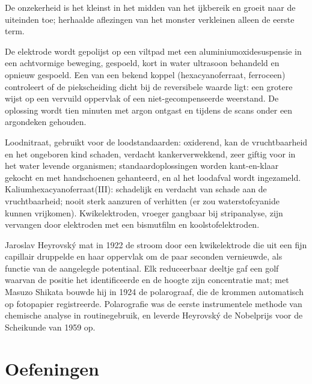 De onzekerheid is het kleinst in het midden van het ijkbereik en groeit
naar de uiteinden toe; herhaalde aflezingen van het monster verkleinen
alleen de eerste term.

\begin{inthelab}
De elektrode wordt gepolijst op een viltpad met een
aluminiumoxidesuspensie in een achtvormige beweging, gespoeld, kort in
water ultrasoon behandeld en opnieuw gespoeld. Een  van een
bekend koppel (hexacyanoferraat, ferroceen) controleert of de
piekscheiding dicht bij de reversibele waarde ligt: een grotere wijst op
een vervuild oppervlak of een niet-gecompenseerde weerstand. De oplossing
wordt tien minuten met argon ontgast en tijdens de scans onder een
argondeken gehouden.
\end{inthelab}

\begin{safety}{}
Loodnitraat, gebruikt voor de loodstandaarden: oxiderend, kan de
vruchtbaarheid en het ongeboren kind schaden, verdacht kankerverwekkend,
zeer giftig voor in het water levende organismen; standaardoplossingen
worden kant-en-klaar gekocht en met handschoenen gehanteerd, en al het
loodafval wordt ingezameld. Kaliumhexacyanoferraat(III): schadelijk en
verdacht van schade aan de vruchtbaarheid; nooit sterk aanzuren of
verhitten (er zou waterstofcyanide kunnen vrijkomen). Kwikelektroden,
vroeger gangbaar bij stripanalyse, zijn vervangen door elektroden met een
bismutfilm en koolstofelektroden.
\end{safety}

\begin{history}
Jaroslav Heyrovský mat in 1922 de stroom door een kwikelektrode die uit
een fijn capillair druppelde en haar oppervlak om de paar seconden
vernieuwde, als functie van de aangelegde potentiaal. Elk reduceerbaar
deeltje gaf een golf waarvan de positie het identificeerde en de hoogte
zijn concentratie mat; met Masuzo Shikata bouwde hij in 1924 de
polarograaf, die de krommen automatisch op fotopapier registreerde.
Polarografie was de eerste instrumentele methode van chemische analyse in
routinegebruik, en leverde Heyrovský de Nobelprijs voor de Scheikunde van
1959 op.
\end{history}

\section{Oefeningen}

